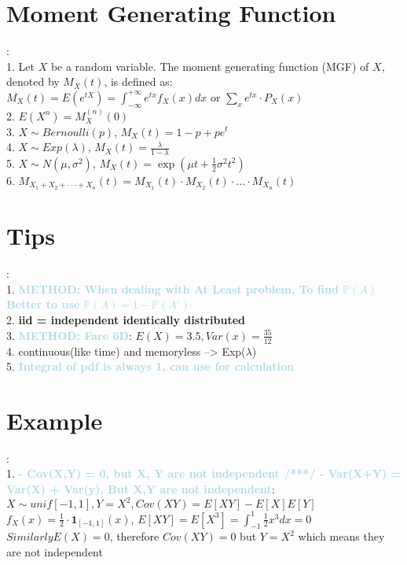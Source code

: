 \documentclass[twocolumn]{article}
\newcommand{\method}[1]{\textbf{\textcolor{lightblue}{#1}}}
\newcommand{\sectionspace}{\vspace*{1em}}
\begin{document}
\section{Moment Generating Function}
:\\
1. Let $X$ be a random variable. The moment generating function (MGF) of $X$, denoted by $M_X (t)$, is defined as:\\
$M_X (t)  = E(e^{tX}) =  \int_{-\infty}^{+\infty} e^{tx} f_X(x) dx$ or $\sum_{x} e^{tx} \cdot P_X(x) $\\
2. $E(X^n) = M_X^{(n)}(0)$\\
3. $X \sim Bernoulli(p)$, $M_X(t) = 1 - p + p e^t$\\
4. $X \sim Exp(\lambda)$, $M_X(t) = \frac{\lambda}{1-\lambda}$\\
5. $X \sim N(\mu, \sigma^2)$, $M_X(t) = \exp\left(\mu t + \frac{1}{2} \sigma^2 t^2\right)$\\
6. $M_{X_1+X_2+···+X_n}(t)=M_{X_1}(t)·M_{X_2}(t)·...·M_{X_n}(t)$

\sectionspace

\section{Tips}
:\\
1. \method{METHOD: When dealing with At Least problem, To find $\mathbb{P}(A)$ Better to use $\mathbb{P}(A) = 1 - \mathbb{P}(A^{c})$}\\
2. \textbf{iid = independent identically distributed}\\
3. \method{METHOD: Fare  6D}: $E(X) = 3.5, Var(x) = \frac{35}{12}$\\
4. continuous(like time) and memoryless --> Exp($\lambda$)\\
5. \method{Integral of pdf is always 1, can use for calculation} 

\sectionspace

\section{Example}
:\\
1. \method{ - Cov(X,Y) = 0, but X, Y are not independent /***/ - Var(X+Y) = Var(X) + Var(y), But X,Y are not independent}:\\
$X \sim unif[-1,1], Y = X^2, Cov(XY) = E[XY] - E[X]E[Y]$\\
$f_X(x) = \frac{1}{2} \cdot \mathbf{1}_{[-1, 1]}(x)$, $ E[XY] = E[X^3] = \int_{-1}^{1} \frac{1}{2} x^3 dx = 0 $\\
$Similarly E(X) = 0$, therefore $Cov(XY) = 0$ but $Y = X^2$ which means they are not independent
\end{document}
